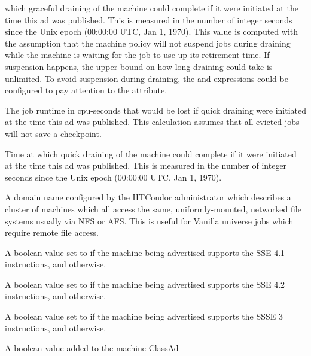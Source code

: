 \begin{description}
which graceful draining of the machine could complete if it were
initiated at the time this ad was published.  This is measured in the
number of integer seconds since the Unix epoch (00:00:00 UTC, Jan 1,
1970).  This value is computed with the assumption that the machine
policy will not suspend jobs during draining while the machine is
waiting for the job to use up its retirement time.  If suspension
happens, the upper bound on how long draining could take is
unlimited.  To avoid suspension during draining, the 
and  expressions could be configured to pay
attention to the  attribute.
%
\item[\AdAttr{ExpectedMachineGracefulQuickBadput}:] The
job runtime in cpu-seconds that would be lost if quick draining
were initiated at the time this ad was published.  This calculation assumes
that all evicted jobs will not save a checkpoint.
%
\item[\AdAttr{ExpectedMachineQuickDrainingCompletion}:] Time at
which quick draining of the machine could complete if it were
initiated at the time this ad was published.  This is measured in the
number of integer seconds since the Unix epoch (00:00:00 UTC, Jan 1,
1970).
%
\item[\AdAttr{FileSystemDomain}:] A domain name configured by the
HTCondor administrator which describes a cluster of machines which all
access the same, uniformly-mounted, networked file systems usually via
NFS or AFS.  This is useful for Vanilla universe jobs which require
remote file access.
%
\item[\AdAttr{Has\_sse4\_1}:] A boolean value set to 
 if the machine being advertised supports
the SSE 4.1 instructions, and  otherwise.
%
\item[\AdAttr{Has\_sse4\_2}:] A boolean value set to 
if the machine being advertised supports
the SSE 4.2 instructions, and  otherwise.
%
\item[\AdAttr{has\_ssse3}:] A boolean value set to 
if the machine being advertised supports
the SSSE 3 instructions, and  otherwise.
%
\item[\AdAttr{HasVM}:] A boolean value added to the machine ClassAd

\end{description}

